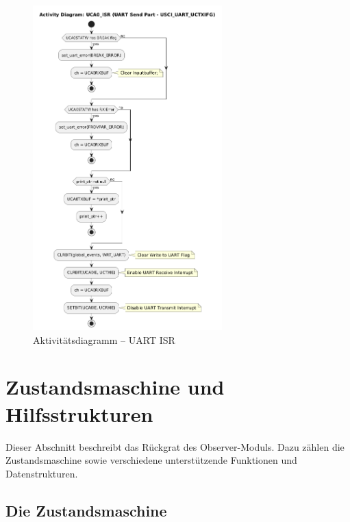 \begin{figure}[h!]
	\centering
	\includegraphics[width=0.65\textwidth]{../Bilder/observer_activity_diagram_eusci_send.png}
	\caption{Aktivit\"atsdiagramm -- UART ISR}
	\label{fig:activity_diagram_uart_isr_send}
\end{figure}


\newpage
\section{Zustandsmaschine und Hilfsstrukturen}
\label{sec:Zustandsmaschine_Hilfsstrukturen}

Dieser Abschnitt beschreibt das \glqq{}R\"uckgrat\grqq{} des Observer-Moduls. Dazu z\"ahlen die Zustandsmaschine sowie verschiedene unterst\"utzende Funktionen und Datenstrukturen.


\subsection{Die Zustandsmaschine}
\label{sec:Zustandsmaschine}

